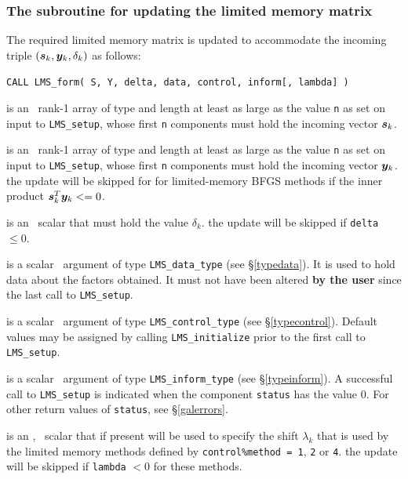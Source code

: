 \documentclass{galahad}
\newcommand{\packagename}{LMS}
\begin{document}

\subsubsection{The subroutine for updating the limited memory matrix}
The required limited memory matrix is updated to accommodate the
incoming triple $({\bm{s}}_k,{\bm{y}}_k,\delta_k)$ as follows:
\vspace*{1mm}

\hspace{8mm}
{\tt CALL \packagename\_form( S, Y, delta, data, control, inform[, lambda] )}

\vspace*{-3mm}
\begin{description}
 is an \intentin\ rank-1 array of type \realdp and length at
least as large as the value {\tt n} as set on input to
{\tt \packagename\_setup}, whose first {\tt n} components must hold the
incoming vector ${\bm{s}}_k$.

 is an \intentin\ rank-1 array of type \realdp and length at
least as large as the value {\tt n} as set on input to
{\tt \packagename\_setup}, whose first {\tt n} components must hold the
incoming vector ${\bm{y}}_k$.
\restriction the update will be skipped for for limited-memory BFGS methods
if the inner product ${\bm{s}}_k^T {\bm{y}}_k <= 0$.

 is an \intentin\ \realdp scalar that must hold the value $\delta_k$.
\restriction the update will be skipped if {\tt delta} $\leq 0$.

 is a scalar \intentinout\ argument of type
{\tt \packagename\_data\_type}
(see \S\ref{typedata}). It is used to hold data about the factors obtained.
It must not have been altered {\bf by the user} since the last call to
{\tt \packagename\_setup}.

 is a scalar \intentin\ argument of type
{\tt \packagename\_control\_type}
(see \S\ref{typecontrol}). Default values may be assigned by calling
{\tt \packagename\_initialize} prior to the first call to
{\tt \packagename\_setup}.

 is a scalar \intentout\ argument of type
{\tt \packagename\_inform\_type}
(see \S\ref{typeinform}). A successful call to
{\tt \packagename\_setup}
is indicated when the  component {\tt status} has the value 0.
For other return values of {\tt status}, see \S\ref{galerrors}.

 is an \optional, \intentin\ \realdp scalar that if present
will be used to specify the shift $\lambda_k$ that is used by the
limited memory methods defined by
{\tt control\%method = 1}, {\tt 2} or {\tt 4}.
\restriction the update will be skipped if {\tt lambda} $< 0$
for these methods.

\end{description}
\end{document}

